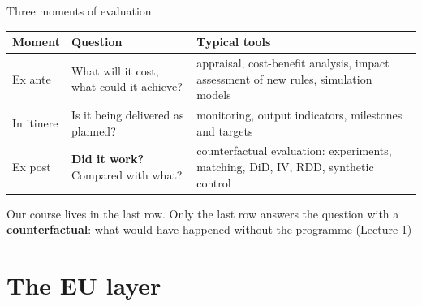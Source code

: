 \documentclass[aspectratio=169,xcolor=table]{beamer}
\begin{document}
\begin{frame}{Three moments of evaluation}
\centering\small
\begin{tabular}{L{2.2cm}L{4.3cm}L{5.2cm}}
\toprule
\textbf{Moment} & \textbf{Question} & \textbf{Typical tools} \\
\midrule
Ex ante & What will it cost, what could it achieve? & appraisal, cost-benefit analysis, impact assessment of new rules, simulation models \\
In itinere & Is it being delivered as planned? & monitoring, output indicators, milestones and targets \\
Ex post & \textbf{Did it work?} Compared with what? & counterfactual evaluation: experiments, matching, DiD, IV, RDD, synthetic control \\
\bottomrule
\end{tabular}
\vspace{0.3cm}

\raggedright
Our course lives in the last row. Only the last row answers the question with a \textbf{counterfactual}: what would have happened without the programme (Lecture 1)
\end{frame}

\section{The EU layer}
\end{document}
